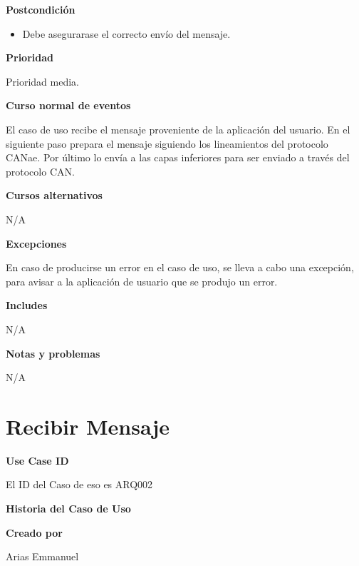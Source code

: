 \large\textbf{Postcondición}
\begin{itemize}
\item Debe asegurarase el correcto envío del mensaje.
\end{itemize}

\large\textbf{Prioridad}
\vspace{3mm}

Prioridad media.

\large\textbf{Curso normal de eventos}
\vspace{3mm}

El caso de uso recibe el mensaje proveniente de la aplicación
del usuario. En el siguiente paso prepara el mensaje siguiendo
los lineamientos del protocolo CANae. Por último lo envía a las
capas inferiores para ser enviado a través del protocolo CAN.

\large\textbf{Cursos alternativos}
\vspace{3mm}

N/A

\large\textbf{Excepciones}
\vspace{3mm}

En caso de producirse un error en el caso de uso, se lleva a cabo
una excepción, para avisar a la aplicación de usuario que se
produjo un error. 

\large\textbf{Includes}
\vspace{3mm}

N/A

\large\textbf{Notas y problemas}
\vspace{3mm}

N/A




\section{Recibir Mensaje}

\large\textbf{Use Case ID}
\vspace{3mm}

El ID del Caso de eso es ARQ002

\Large\textbf{Historia del Caso de Uso}
\vspace{3mm}

\large\textbf{Creado por}
\vspace{3mm}

Arias Emmanuel

